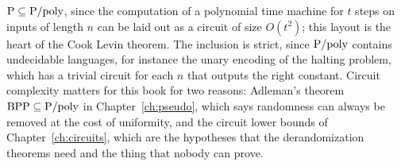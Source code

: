 $\mathrm{P} \subseteq \mathrm{P}/\mathrm{poly}$, since the computation of a polynomial time machine for $t$ steps on inputs of length $n$ can be laid out as a circuit of size $O(t^2)$; this layout is the heart of the Cook Levin theorem. The inclusion is strict, since $\mathrm{P}/\mathrm{poly}$ contains undecidable languages, for instance the unary encoding of the halting problem, which has a trivial circuit for each $n$ that outputs the right constant. Circuit complexity matters for this book for two reasons: Adleman's theorem $\mathrm{BPP} \subseteq \mathrm{P}/\mathrm{poly}$ in Chapter~\ref{ch:pseudo}, which says randomness can always be removed at the cost of uniformity, and the circuit lower bounds of Chapter~\ref{ch:circuits}, which are the hypotheses that the derandomization theorems need and the thing that nobody can prove.
